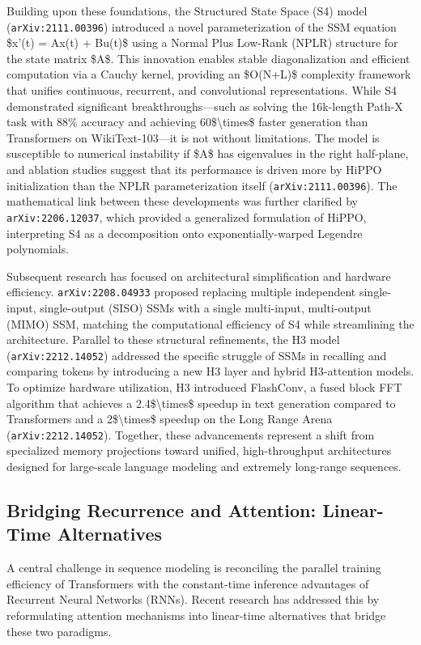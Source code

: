 \documentclass[11pt]{article}
\begin{document}
Building upon these foundations, the Structured State Space (S4) model (\texttt{arXiv:2111.00396}) introduced a novel parameterization of the SSM equation \$x'(t) = Ax(t) + Bu(t)\$ using a Normal Plus Low-Rank (NPLR) structure for the state matrix \$A\$. This innovation enables stable diagonalization and efficient computation via a Cauchy kernel, providing an \$O(N+L)\$ complexity framework that unifies continuous, recurrent, and convolutional representations. While S4 demonstrated significant breakthroughs—such as solving the 16k-length Path-X task with 88\% accuracy and achieving 60\$\textbackslash{}times\$ faster generation than Transformers on WikiText-103—it is not without limitations. The model is susceptible to numerical instability if \$A\$ has eigenvalues in the right half-plane, and ablation studies suggest that its performance is driven more by HiPPO initialization than the NPLR parameterization itself (\texttt{arXiv:2111.00396}). The mathematical link between these developments was further clarified by \texttt{arXiv:2206.12037}, which provided a generalized formulation of HiPPO, interpreting S4 as a decomposition onto exponentially-warped Legendre polynomials.

Subsequent research has focused on architectural simplification and hardware efficiency. \texttt{arXiv:2208.04933} proposed replacing multiple independent single-input, single-output (SISO) SSMs with a single multi-input, multi-output (MIMO) SSM, matching the computational efficiency of S4 while streamlining the architecture. Parallel to these structural refinements, the H3 model (\texttt{arXiv:2212.14052}) addressed the specific struggle of SSMs in recalling and comparing tokens by introducing a new H3 layer and hybrid H3-attention models. To optimize hardware utilization, H3 introduced FlashConv, a fused block FFT algorithm that achieves a 2.4\$\textbackslash{}times\$ speedup in text generation compared to Transformers and a 2\$\textbackslash{}times\$ speedup on the Long Range Arena (\texttt{arXiv:2212.14052}). Together, these advancements represent a shift from specialized memory projections toward unified, high-throughput architectures designed for large-scale language modeling and extremely long-range sequences.

\subsection{Bridging Recurrence and Attention: Linear-Time Alternatives}

A central challenge in sequence modeling is reconciling the parallel training efficiency of Transformers with the constant-time inference advantages of Recurrent Neural Networks (RNNs). Recent research has addressed this by reformulating attention mechanisms into linear-time alternatives that bridge these two paradigms.
\end{document}
